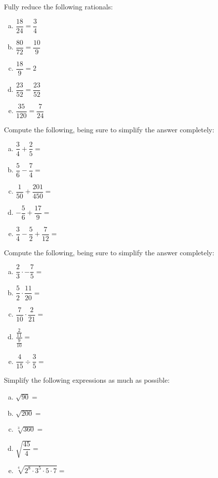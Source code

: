 \documentclass[11pt,letterpaper]{article}
\begin{document}
\vfill



 Fully reduce the following rationals: \pspace
\begin{enumerate}[(a)] \itemsep=2ex
\item $\dfrac{18}{24}= \dfrac{3}{4}$
\item $\dfrac{80}{72}= \dfrac{10}{9}$
\item $\dfrac{18}{9}= 2$
\item $\dfrac{23}{52}= \dfrac{23}{52}$
\item $\dfrac{35}{120}= \dfrac{7}{24}$
\end{enumerate} \pspace



\vfill
\newpage



 Compute the following, being sure to simplify the answer completely: \pspace
\begin{enumerate}[(a)] \itemsep=2ex
\item $\dfrac{3}{4} + \dfrac{2}{5}=$
\item $\dfrac{5}{6} - \dfrac{7}{4}=$
\item $\dfrac{1}{50} + \dfrac{201}{450}=$
\item $-\dfrac{5}{6} + \dfrac{17}{9}=$
\item $\dfrac{3}{4} - \dfrac{5}{2} + \dfrac{7}{12}=$
\end{enumerate}




\vfill



 Compute the following, being sure to simplify the answer completely:
\begin{enumerate}[(a)] \itemsep=2ex
\item $\dfrac{2}{3} \cdot -\dfrac{7}{5}=$
\item $\dfrac{5}{2} \cdot \dfrac{11}{20}=$
\item $\dfrac{7}{10} \cdot \dfrac{2}{21}=$
\item $\dfrac{\frac{2}{11}}{\frac{9}{10}}=$
\item $\dfrac{4}{15} \div \dfrac{3}{5}=$
\end{enumerate}



\vfill



 Simplify the following expressions as much as possible:
\begin{enumerate}[(a)] \itemsep=2ex
\item $\sqrt{90}=$
\item $\sqrt{200}=$
\item $\sqrt[3]{360}=$
\item $\sqrt{\dfrac{45}{4}}=$
\item $\sqrt[4]{2^8 \cdot 3^5 \cdot 5 \cdot 7}=$
\end{enumerate}
\end{document}
